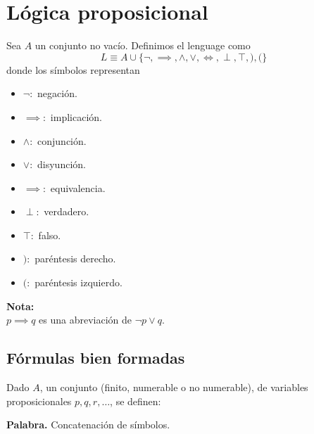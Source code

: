 \section{Lógica proposicional}
Sea $A$ un conjunto no vacío. 
Definimos el lenguage como
$$L \equiv A\cup\{\neg,\implies, \wedge, \vee, \iff, \perp, \top, ), ( \}$$
donde los símbolos representan
\begin{itemize}
	\item $\neg:$ negación.
	\item $\implies:$ implicación.
	\item $\wedge:$ conjunción.
	\item $\vee:$ disyunción.
	\item $\implies:$ equivalencia.
	\item $\perp:$ verdadero.
	\item $\top:$ falso.
	\item $):$ paréntesis derecho.
	\item $(:$ paréntesis izquierdo.
\end{itemize}

\begin{mdframed}
\noindent\textbf{Nota:}\\
$p\implies q$ es una abreviación de $\neg p \vee q$.
\end{mdframed}

\subsection{Fórmulas bien formadas}
Dado $A$, un conjunto (finito, numerable o no numerable), de variables proposicionales $p, q, r, \hdots$, se definen:

\begin{defn}{\textbf{Palabra.}}
	Concatenación de símbolos.
\end{defn}

